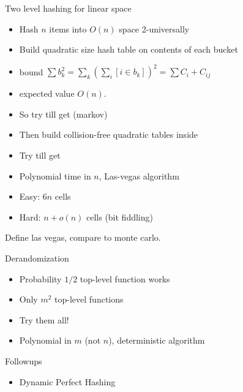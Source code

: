 \documentclass[12pt]{article}
\begin{document}
Two level hashing for linear space
\begin{itemize}
\item Hash $n$ items into $O(n)$ space 2-universally
\item Build quadratic size hash table on contents of each bucket
\item bound $\sum b_k^2=\sum_k (\sum_i [i \in b_k])^2 =\sum C_i + C_{ij}$
\item expected value $O(n)$.  
\item So try till get (markov)
\item Then build collision-free quadratic tables inside 
\item Try till get 
\item Polynomial time in $n$, Las-vegas algorithm
\item Easy: $6n$ cells
\item Hard: $n+o(n)$ cells (bit fiddling)
\end{itemize}


Define las vegas, compare to monte carlo.

Derandomization
\begin{itemize}
\item Probability $1/2$ top-level function works
\item Only $m^2$ top-level functions
\item Try them all!
\item Polynomial in $m$ (not $n$), deterministic algorithm
\end{itemize}

Followups
\begin{itemize}
\item Dynamic Perfect Hashing
\end{itemize}
\end{document}
